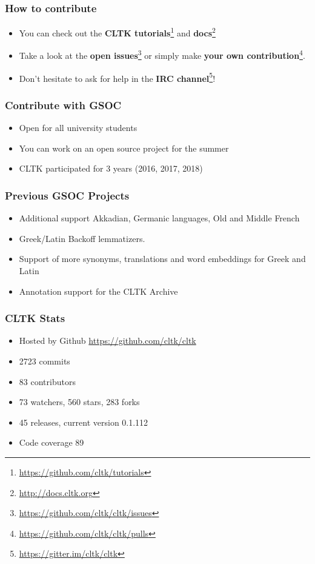\documentclass{beamer}
\begin{document}
\begin{frame}
\frametitle{How to contribute}
\begin{itemize}
    \item You can check out the \textbf{CLTK tutorials}\footnote{\href{https://github.com/cltk/tutorials}{https://github.com/cltk/tutorials}} and \textbf{docs}\footnote{\href{http://docs.cltk.org}{http://docs.cltk.org}}
    \item Take a look at the \textbf{open issues}\footnote{\href{https://github.com/cltk/cltk/issues}{https://github.com/cltk/cltk/issues}} or simply make \textbf{your own contribution}\footnote{\href{https://github.com/cltk/cltk/pulls}{https://github.com/cltk/cltk/pulls}}.
    \item Don’t hesitate to ask for help in the \textbf{IRC channel}\footnote{\href{https://gitter.im/cltk/cltk}{https://gitter.im/cltk/cltk}}!
\end{itemize}
\end{frame}

\begin{frame}
\frametitle{Contribute with GSOC}
\begin{itemize}
    \item Open for all university students
    \item You can work on an open source project for the summer
    \item CLTK participated for 3 years (2016, 2017, 2018)
\end{itemize}
\end{frame}

\begin{frame}
\frametitle{Previous GSOC Projects}
\begin{itemize}
    \item Additional support Akkadian, Germanic languages, Old and Middle French
    \item Greek/Latin Backoff lemmatizers.
    \item Support of more synonyms, translations and word embeddings for Greek and Latin
    \item Annotation support for the CLTK Archive
\end{itemize}
\end{frame}


\begin{frame}
\frametitle{CLTK Stats}
\begin{itemize}
\item Hosted by Github \href{https://github.com/cltk/cltk}{https://github.com/cltk/cltk}
\item 2723 commits
\item 83 contributors
\item 73 watchers, 560 stars, 283 forks
\item 45 releases, current version 0.1.112
\item Code coverage 89%
\end{itemize}


\end{frame}
\end{document}
